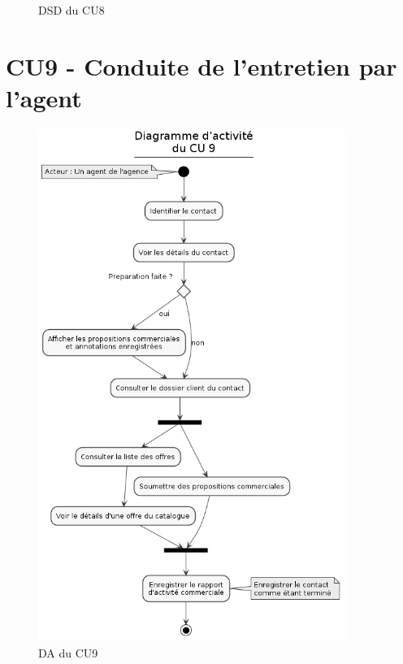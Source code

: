 \begin{figure}[H]
\noindent{}
\caption{DSD du CU8}
\end{figure}

\clearpage
\section{CU9 - Conduite de l’entretien par l’agent}

\begin{figure}[H]
\centering
\includegraphics[width=10cm]{figures/DA_CU9.png}
\caption{DA du CU9}
\end{figure}


